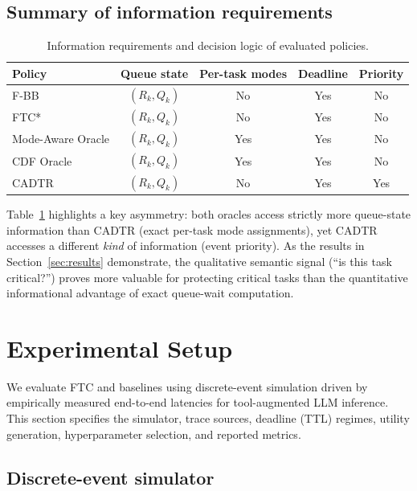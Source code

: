 \documentclass[fleqn,12pt,lineno]{wlpeerj}
\begin{document}
\subsection{Summary of information requirements}
\label{sec:baseline_summary}

\begin{table}[t]
\centering
\caption{Information requirements and decision logic of evaluated policies.}
\label{tab:info_requirements}
\begin{tabular}{lcccc}
\toprule
\textbf{Policy} & \textbf{Queue state} & \textbf{Per-task modes} & \textbf{Deadline} & \textbf{Priority} \\
\midrule
F-BB            & $(R_k, Q_k)$ & No  & Yes & No  \\
FTC*            & $(R_k, Q_k)$ & No  & Yes & No  \\
Mode-Aware Oracle & $(R_k, Q_k)$ & Yes & Yes & No  \\
CDF Oracle      & $(R_k, Q_k)$ & Yes & Yes & No  \\
CADTR           & $(R_k, Q_k)$ & No  & Yes & Yes \\
\bottomrule
\end{tabular}
\end{table}

Table~\ref{tab:info_requirements} highlights a key asymmetry: both oracles access strictly more queue-state information than CADTR (exact per-task mode assignments), yet CADTR accesses a different \emph{kind} of information (event priority). As the results in Section~\ref{sec:results} demonstrate, the qualitative semantic signal (``is this task critical?'') proves more valuable for protecting critical tasks than the quantitative informational advantage of exact queue-wait computation.

\section{Experimental Setup}
\label{sec:exp_setup}

We evaluate FTC and baselines using discrete-event simulation driven by empirically measured end-to-end latencies for tool-augmented LLM inference. This section specifies the simulator, trace sources, deadline (TTL) regimes, utility generation, hyperparameter selection, and reported metrics.

\subsection{Discrete-event simulator}
\label{sec:simulator}
\end{document}
